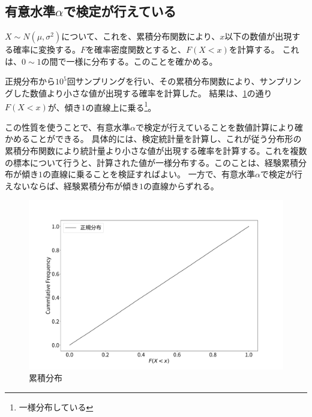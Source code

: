 

\subsection{有意水準$\alpha$で検定が行えている}
$X\sim N(\mu,\sigma^2)$について、これを、累積分布関数により、$x$以下の数値が出現する確率に変換する。$F$を確率密度関数とすると、$F(X<x)$を計算する。
これは、$0\sim 1$の間で一様に分布する。このことを確かめる。

正規分布から$10^5$回サンプリングを行い、その累積分布関数により、サンプリングした数値より小さな値が出現する確率を計算した。
結果は、\ref{fig:test_cummlative_distribution}の通り$F(X<x)$が、傾き$1$の直線上に乗る\footnote{一様分布している}。

この性質を使うことで、有意水準$\alpha$で検定が行えていることを数値計算により確かめることができる。
具体的には、検定統計量を計算し、これが従う分布形の累積分布関数により統計量より小さな値が出現する確率を計算する。これを複数の標本について行うと、計算された値が一様分布する。このことは、経験累積分布が傾き$1$の直線に乗ることを検証すればよい。
一方で、有意水準$\alpha$で検定が行えないならば、経験累積分布が傾き$1$の直線からずれる。


\begin{figure}
  \begin{center}
    \includegraphics[width=15cm]{./image/04_/test_cummlative_distribution.pdf}
    \caption{累積分布}
   \label{fig:test_cummlative_distribution}
    \end{center}
\end{figure}



